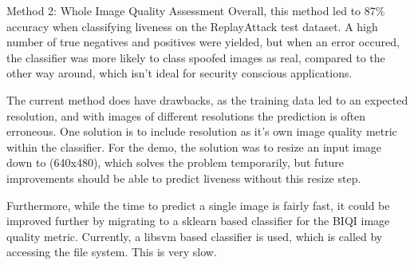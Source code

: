\documentclass[final]{beamer}
\begin{document}
\begin{frame}{}
\begin{columns}[t]
\begin{column}{.48\linewidth}
\begin{block}{Method 2: Whole Image Quality Assessment}
          Overall, this method led to 87\% accuracy when classifying liveness on the ReplayAttack test dataset. 
          A high number of true negatives and positives were yielded, but when an error occured, the classifier was more likely to class
          spoofed images as real, compared to the other way around, which isn't ideal for security conscious applications.

          The current method does have drawbacks, as the training data led to an expected resolution, and with images of different resolutions
          the prediction is often erroneous. One solution is to include resolution as it's own image quality metric within the classifier. For the demo,
          the solution was to resize an input image down to (640x480), which solves the problem temporarily, but future improvements should be able to predict
          liveness without this resize step.

          Furthermore, while the time to predict a single image is fairly fast, it could be improved further by migrating to a sklearn based classifier for the BIQI image quality metric.
          Currently, a libsvm based classifier is used, which is called by accessing the file system. This is very slow.

        \end{block}

          

\end{column}
\end{columns}
\end{frame}
\end{document}
